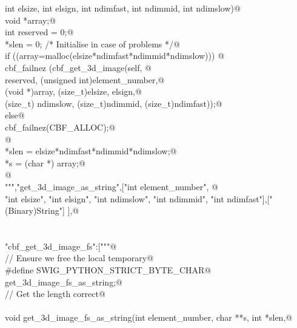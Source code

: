 \documentclass[10pt,a4paper,twoside,notitlepage]{article}
\begin{document}
\begin{flushleft}
\begin{minipage}{\linewidth}
\begin{list}{}{}
\mbox{}\verb@    int elsize, int elsign, int ndimfast, int ndimmid, int ndimslow){@\\
\mbox{}\verb@        void *array;@\\
\mbox{}\verb@        int reserved = 0;@\\
\mbox{}\verb@        *slen = 0; /* Initialise in case of problems */@\\
\mbox{}\verb@        if ((array=malloc(elsize*ndimfast*ndimmid*ndimslow))) {@\\
\mbox{}\verb@               cbf_failnez (cbf_get_3d_image(self, @\\
\mbox{}\verb@               reserved, (unsigned int)element_number,@\\
\mbox{}\verb@               (void *)array, (size_t)elsize, elsign,@\\
\mbox{}\verb@               (size_t) ndimslow, (size_t)ndimmid, (size_t)ndimfast));@\\
\mbox{}\verb@         }else{@\\
\mbox{}\verb@               cbf_failnez(CBF_ALLOC);@\\
\mbox{}\verb@         }@\\
\mbox{}\verb@        *slen = elsize*ndimfast*ndimmid*ndimslow;@\\
\mbox{}\verb@        *s = (char *) array;@\\
\mbox{}\verb@      }@\\
\mbox{}\verb@""","get_3d_image_as_string",["int element_number", @\\
\mbox{}\verb@    "int elsize", "int elsign", "int ndimslow", "int ndimmid", "int ndimfast"],["(Binary)String"] ],@\\
\mbox{}\verb@@\\
\mbox{}\verb@@\\
\mbox{}\verb@"cbf_get_3d_image_fs":["""@\\
\mbox{}\verb@// Ensure we free the local temporary@\\
\mbox{}\verb@%{@\\
\mbox{}\verb@#define SWIG_PYTHON_STRICT_BYTE_CHAR@\\
\mbox{}\verb@%}@\\
\mbox{}\verb@%cstring_output_allocate_size(char ** s, int *slen, free(*$1))@\\
\mbox{}\verb@       get_3d_image_fs_as_string;@\\
\mbox{}\verb@// Get the length correct@\\
\mbox{}\verb@@\\
\mbox{}\verb@    void get_3d_image_fs_as_string(int element_number, char **s, int *slen,@\\

\end{list}
\end{minipage}
\end{flushleft}
\end{document}
